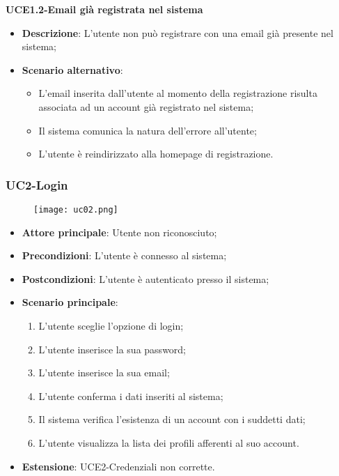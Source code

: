 \pagebreak

\textbf{UCE1.2-Email già registrata nel sistema}

\begin{itemize}
\item \textbf{Descrizione}: L'utente non può registrare con una email già presente nel sistema;
\item \textbf{Scenario alternativo}:
\begin{itemize}
\item L'email inserita dall'utente al momento della registrazione risulta associata ad un account già registrato nel sistema;
\item Il sistema comunica la natura dell'errore all'utente;
\item L'utente è reindirizzato alla homepage di registrazione.
\end{itemize}
\end{itemize}

\subsubsection{UC2-Login}
\begin{figure}[h] \texttt{[image: uc02.png]} \end{figure}

\begin{itemize}
\item \textbf{Attore principale}: Utente non riconosciuto;
\item \textbf{Precondizioni}: L'utente è connesso al sistema;
\item \textbf{Postcondizioni}: L'utente è autenticato presso il sistema;
\item \textbf{Scenario principale}:
\begin{enumerate}
\item L'utente sceglie l'opzione di login;
\item L'utente inserisce la sua password;
\item L'utente inserisce la sua email;
\item L'utente conferma i dati inseriti al sistema;
\item Il sistema verifica l'esistenza di un account con i suddetti dati;
\item L'utente visualizza la lista dei profili afferenti al suo account.
\end{enumerate}
\item \textbf{Estensione}: UCE2-Credenziali non corrette.
\end{itemize}

